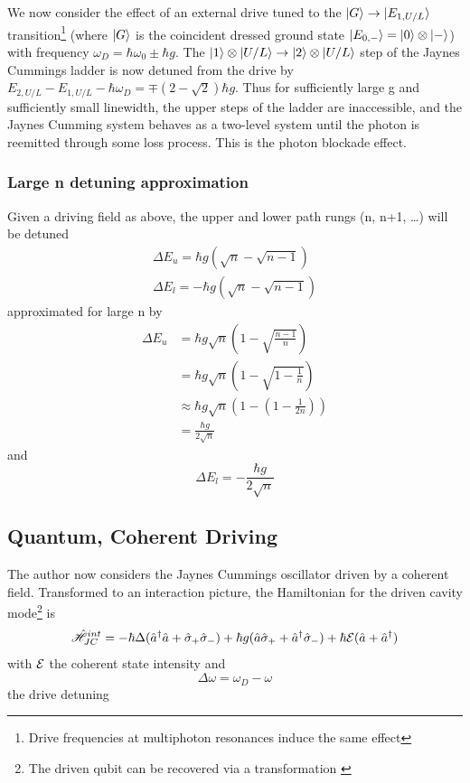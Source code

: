 We now consider the effect of an external drive tuned to the $| G \rangle \rightarrow | E_{1, U/L} \rangle$ transition\footnote{Drive frequencies at multiphoton resonances induce the same effect} (where $| G \rangle$ is the coincident dressed ground state $| E_{0, -} \rangle = | 0 \rangle \otimes | - \rangle$) with frequency $\omega_D = \hbar \omega_0 \pm \hbar g$.
The $| 1 \rangle \otimes | U/L \rangle \rightarrow | 2 \rangle \otimes | U/L \rangle$ step of the Jaynes Cummings ladder is now detuned from the drive by $E_{2, U/L} - E_{1, U/L} - \hbar \omega_D =  \mp(2-\sqrt{2}) \hbar g$. Thus for sufficiently large g and sufficiently small linewidth, the upper steps of the ladder are inaccessible, and the Jaynes Cumming system behaves as a two-level system until the photon is reemitted through some loss process. This is the photon blockade effect.
\subsubsection{Large n detuning approximation}
Given a driving field as above, the upper and lower path rungs (n, n+1, \dots) will be detuned
\begin{align}
  \Delta E_u = \hbar g (\sqrt{n}-\sqrt{n-1}) \\
  \Delta E_l = -\hbar g (\sqrt{n}-\sqrt{n-1})
\end{align}
approximated for large n by
\begin{align}
  \Delta E_u &= \hbar g \sqrt{n} \left (1-\sqrt{\frac{n-1}{n}} \right ) \\
  &= \hbar g \sqrt{n} \left (1-\sqrt{1-\frac{1}{n}} \right ) \\
  & \approx \hbar g \sqrt{n} \left ( 1- \left ( 1 - \frac{1}{2n} \right ) \right ) \\
  &= \frac{\hbar g}{2 \sqrt{n}}
\end{align}
and
\begin{equation}
  \Delta E_l = -\frac{\hbar g}{2 \sqrt{n}}
\end{equation}
\subsection{Quantum, Coherent Driving}
The author now considers the Jaynes Cummings oscillator driven by a coherent field. Transformed to an interaction picture, the Hamiltonian for the driven cavity mode\footnote{The driven qubit can be recovered via a transformation \autocite{Alsing1999}} is
\begin{equation}
  \hat{\mathscr{H}}_{JC}^{int} = -\hbar \Delta (\hat{a}^\dagger \hat{a} + \hat{\sigma}_+ \hat{\sigma}_-) + \hbar g(\hat{a} \hat{\sigma}_+ + \hat{a}^\dagger \hat{\sigma}_-) + \hbar \mathcal{E}(\hat{a} + \hat{a}^\dagger)
\end{equation}
with $\mathcal{E}$ the coherent state intensity and
\begin{equation}
  \Delta \omega = \omega_D - \omega
\end{equation}
the drive detuning

